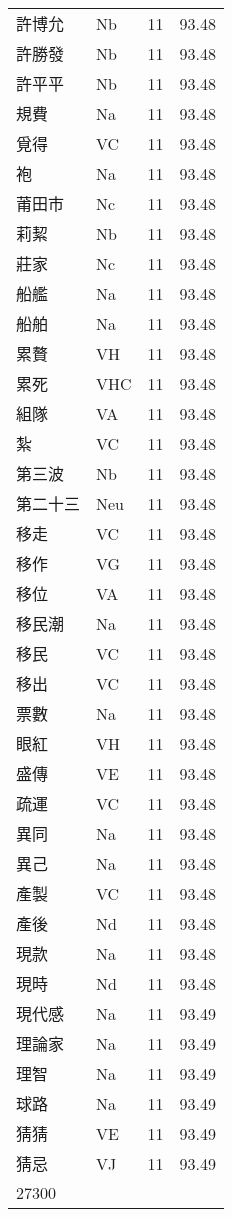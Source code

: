 \documentclass[twocolumn]{book}
\begin{document}
\begin{supertabular}{llrr}
許博允 & Nb & 11 &  93.48\\
許勝發 & Nb & 11 &  93.48\\
許平平 & Nb & 11 &  93.48\\
規費 & Na & 11 &  93.48\\
覓得 & VC & 11 &  93.48\\
袍 & Na & 11 &  93.48\\
莆田市 & Nc & 11 &  93.48\\
莉絜 & Nb & 11 &  93.48\\
莊家 & Nc & 11 &  93.48\\
船艦 & Na & 11 &  93.48\\
船舶 & Na & 11 &  93.48\\
累贅 & VH & 11 &  93.48\\
累死 & VHC & 11 &  93.48\\
組隊 & VA & 11 &  93.48\\
紮 & VC & 11 &  93.48\\
第三波 & Nb & 11 &  93.48\\
第二十三 & Neu & 11 &  93.48\\
移走 & VC & 11 &  93.48\\
移作 & VG & 11 &  93.48\\
移位 & VA & 11 &  93.48\\
移民潮 & Na & 11 &  93.48\\
移民 & VC & 11 &  93.48\\
移出 & VC & 11 &  93.48\\
票數 & Na & 11 &  93.48\\
眼紅 & VH & 11 &  93.48\\
盛傳 & VE & 11 &  93.48\\
疏運 & VC & 11 &  93.48\\
異同 & Na & 11 &  93.48\\
異己 & Na & 11 &  93.48\\
產製 & VC & 11 &  93.48\\
產後 & Nd & 11 &  93.48\\
現款 & Na & 11 &  93.48\\
現時 & Nd & 11 &  93.48\\
現代感 & Na & 11 &  93.49\\
理論家 & Na & 11 &  93.49\\
理智 & Na & 11 &  93.49\\
球路 & Na & 11 &  93.49\\
猜猜 & VE & 11 &  93.49\\
猜忌 & VJ & 11 &  93.49\\
27300\\

\end{supertabular}
\end{document}
